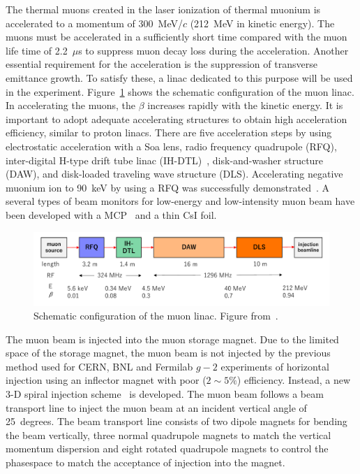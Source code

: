 The thermal muons created in the laser ionization of thermal muonium is
accelerated to a momentum of 300~MeV/$c$ (212~MeV in kinetic energy).
The muons must be accelerated in a sufficiently short time
compared with the muon life time of 2.2~$\mu$s
to suppress muon decay loss during the acceleration.
Another essential requirement for the acceleration is
the suppression of transverse emittance growth.
To satisfy these, a linac dedicated to this purpose will be used in the experiment.
Figure~\ref{fig:mulinac_config} shows the schematic configuration
of the muon linac.
In accelerating the muons, the $\beta$ increases rapidly with the kinetic energy.
It is important to adopt adequate accelerating structures to obtain high acceleration efficiency,
similar to proton linacs. 
There are five acceleration steps by using electrostatic acceleration with a Soa lens,
radio frequency quadrupole (RFQ),
inter-digital H-type drift tube linac (IH-DTL)~\cite{Otani:2016swo},
disk-and-washer structure (DAW),
and disk-loaded traveling wave structure (DLS).
Accelerating negative muonium ion to 90~keV by using a RFQ
was successfully demonstrated~\cite{Bae:2018atj}.
A several types of beam monitors for low-energy and low-intensity muon beam have been
developed with a MCP~\cite{Kim:2018aah} and a thin CsI foil.

\begin{figure}[t]
\centering
\includegraphics*[width=1.0\textwidth,bb=0 0 680 170]{Fig/muonlinac.pdf}
\caption{Schematic configuration of the muon linac. Figure from~\cite{TDRsummarypaper}.}
\label{fig:mulinac_config}
\end{figure}


The muon beam is injected into the muon storage magnet. 
Due to the limited space of the storage magnet, 
the muon beam is not injected by the previous method used for CERN, BNL and Fermilab $g-2$ experiments 
of horizontal injection using an inflector magnet with poor ($2\sim5\%$) efficiency. 
Instead, a new $3$-D spiral injection scheme~\cite{Iinuma:2016zfu} is developed.
The muon beam follows a beam transport line to inject the muon 
beam at an incident vertical angle of 25~degrees. The beam transport line consists of 
two dipole magnets for bending the beam vertically, three normal quadrupole magnets
to match the vertical momentum dispersion and eight rotated quadrupole magnets
to control the phasespace to match the acceptance of injection into the magnet.


